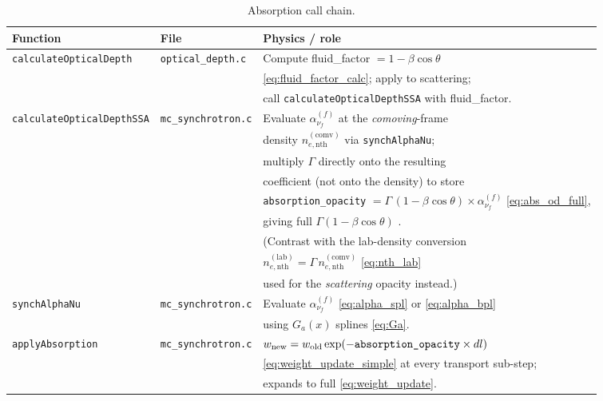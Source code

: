 \documentclass[12pt,a4paper]{article}
\newcommand{\nuf}{\nu_{\!f}}
\newcommand{\code}[1]{\texttt{#1}}
\begin{document}
\begin{table}[h]
	\centering
	\caption{Absorption call chain.}
	\label{tab:callchain_abs}
	\renewcommand{\arraystretch}{1.4}
	\begin{tabular}{p{} p{} p{}}
		\toprule
		\textbf{Function} & \textbf{File} & \textbf{Physics / role} \\
		\midrule
		\code{calculateOpticalDepth}
		& \code{optical\_depth.c}
		& Compute fluid\_factor $= 1 - \beta\cos\theta$ \\
		& & \eqref{eq:fluid_factor_calc}; apply to scattering; \\
		& & call \code{calculateOpticalDepthSSA}
		with fluid\_factor. \\
		\midrule
		\code{calculateOpticalDepthSSA}
		& \code{mc\_synchrotron.c}
		& Evaluate $\alpha_{\nuf}^{(f)}$ at the \emph{comoving}-frame \\
		& & density $n_{e,\mathrm{nth}}^{(\mathrm{comv})}$ via
		\code{synchAlphaNu}; \\
		& & multiply $\Gamma$ directly onto the resulting \\
		& & coefficient (not onto the density) to store \\
		& & \code{absorption\_opacity} $= \Gamma\,(1{-}\beta\cos\theta)
		\times\alpha_{\nuf}^{(f)}$ \eqref{eq:abs_od_full}, \\
		& & giving full $\Gamma(1{-}\beta\cos\theta)$
		\citep{abramowicz1991}. \\
		& & (Contrast with the lab-density conversion \\
		& & $n_{e,\mathrm{nth}}^{(\mathrm{lab})}=\Gamma\,n_{e,\mathrm{nth}}^{(\mathrm{comv})}$
		\eqref{eq:nth_lab} \\
		& & used for the \emph{scattering} opacity instead.) \\
		\midrule
		\code{synchAlphaNu}
		& \code{mc\_synchrotron.c}
		& Evaluate $\alpha_{\nuf}^{(f)}$ \eqref{eq:alpha_spl}
		or \eqref{eq:alpha_bpl} \\
		& & using $G_a(x)$ splines \eqref{eq:Ga}. \\
		\midrule
		\code{applyAbsorption}
		& \code{mc\_synchrotron.c}
		& $w_{\rm new} = w_{\rm old}
		\exp(-\code{absorption\_opacity}\times dl)$ \\
		& & \eqref{eq:weight_update_simple} at every transport sub-step; \\
		& & expands to full \citet{abramowicz1991}
		\eqref{eq:weight_update}. \\
		\bottomrule
	\end{tabular}
\end{table}
\end{document}
